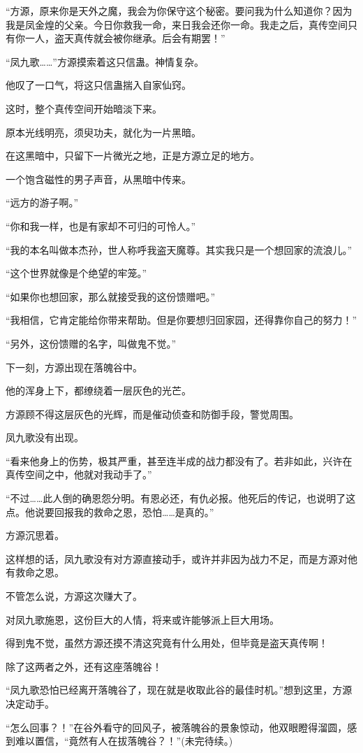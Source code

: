 \begin{this_body}
“方源，原来你是天外之魔，我会为你保守这个秘密。要问我为什么知道你？因为我是凤金煌的父亲。今日你救我一命，来日我会还你一命。我走之后，真传空间只有你一人，盗天真传就会被你继承。后会有期罢！”

“凤九歌……”方源摸索着这只信蛊。神情复杂。

他叹了一口气，将这只信蛊揣入自家仙窍。

这时，整个真传空间开始暗淡下来。

原本光线明亮，须臾功夫，就化为一片黑暗。

在这黑暗中，只留下一片微光之地，正是方源立足的地方。

一个饱含磁性的男子声音，从黑暗中传来。

“远方的游子啊。”

“你和我一样，也是有家却不可归的可怜人。”

“我的本名叫做本杰孙，世人称呼我盗天魔尊。其实我只是一个想回家的流浪儿。”

“这个世界就像是个绝望的牢笼。”

“如果你也想回家，那么就接受我的这份馈赠吧。”

“我相信，它肯定能给你带来帮助。但是你要想归回家园，还得靠你自己的努力！”

“另外，这份馈赠的名字，叫做鬼不觉。”

下一刻，方源出现在落魄谷中。

他的浑身上下，都缭绕着一层灰色的光芒。

方源顾不得这层灰色的光辉，而是催动侦查和防御手段，警觉周围。

凤九歌没有出现。

“看来他身上的伤势，极其严重，甚至连半成的战力都没有了。若非如此，兴许在真传空间之中，他就对我动手了。”

“不过……此人倒的确恩怨分明。有恩必还，有仇必报。他死后的传记，也说明了这点。他说要回报我的救命之恩，恐怕……是真的。”

方源沉思着。

这样想的话，凤九歌没有对方源直接动手，或许并非因为战力不足，而是方源对他有救命之恩。

不管怎么说，方源这次赚大了。

对凤九歌施恩，这份巨大的人情，将来或许能够派上巨大用场。

得到鬼不觉，虽然方源还摸不清这究竟有什么用处，但毕竟是盗天真传啊！

除了这两者之外，还有这座落魄谷！

“凤九歌恐怕已经离开落魄谷了，现在就是收取此谷的最佳时机。”想到这里，方源决定动手。

“怎么回事？！”在谷外看守的回风子，被落魄谷的景象惊动，他双眼瞪得溜圆，感到难以置信，“竟然有人在拔落魄谷？！”(未完待续。)

\end{this_body}

